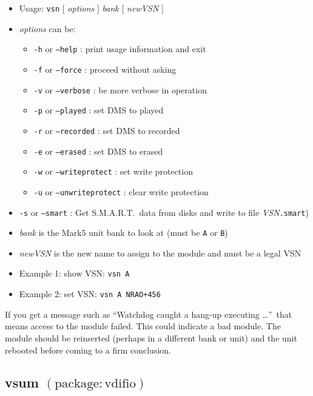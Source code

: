 \begin{itemize}
\item[] Usage: {\tt vsn} $[$ {\em options} $]$ {\em bank} $[$ {\em newVSN} $]$
\item[] {\em options} can be:
\begin{itemize}
\item[] {\tt -h} or {\tt --help} : print usage information and exit
\item[] {\tt -f} or {\tt --force} : proceed without asking
\item[] {\tt -v} or {\tt --verbose} : be more verbose in operation
\item[] {\tt -p} or {\tt --played} : set DMS to played
\item[] {\tt -r} or {\tt --recorded} : set DMS to recorded
\item[] {\tt -e} or {\tt --erased} : set DMS to erased
\item[] {\tt -w} or {\tt --writeprotect} : set write protection
\item[] {\tt -u} or {\tt --unwriteprotect} : clear write protection
\end{itemize}
\item[] {\tt -s} or {\tt --smart} : Get S.M.A.R.T.\ data from disks and write to file {\em VSN}{\tt .smart})
\item[] {\em bank} is the Mark5 unit bank to look at (must be {\tt A} or {\tt B})
\item[] {\em newVSN} is the new name to assign to the module and must be a legal VSN
\item[] Example 1: show VSN: {\tt vsn A}
\item[] Example 2: set VSN: {\tt vsn A NRAO+456}
\end{itemize}

If you get a message such as ``Watchdog caught a hang-up executing \ldots''\ that means access to the module failed.
This could indicate a bad module.
The module should be reinserted (perhaps in a different bank or unit) and the unit rebooted before coming to a firm conclusion.








\subsection{vsum {\small $\mathrm{(package: vdifio)}$}} \label{sec:vsum}

